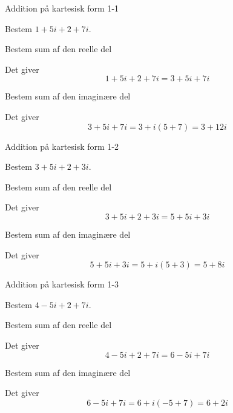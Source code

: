 \documentclass{article}
\begin{document}
\tableofcontents
\newpage

\begin{exercise}{Addition på kartesisk form 1-1}

Bestem $1+5i+2+7i$.


\hint

Bestem sum af den reelle del

\hint

Det giver
\[
1+5i+2+7i = 3 + 5i +7i
\]

\hint

Bestem sum af den imaginære del 


\hint

Det giver 
\[
3 + 5i +7i = 3 + i(5+7) = 3 + 12i
\]

\end{exercise}

\newpage

\begin{exercise}{Addition på kartesisk form 1-2}
	
	Bestem $3+5i+2+3i$.
	
	
	\hint
	
	Bestem sum af den reelle del
	
	\hint
	
	Det giver
	\[
	3+5i+2+3i = 5 + 5i+3i
	\]
	
	\hint
	
	Bestem sum af den imaginære del 
	
	
	\hint
	
	Det giver 
	\[
	5 + 5i+3i = 5 + i(5+3)  = 5 + 8i 
	\]
	
\end{exercise}

\newpage

\begin{exercise}{Addition på kartesisk form 1-3}
	
	Bestem $4-5i+2+7i$.
	
	
	\hint
	
	Bestem sum af den reelle del
	
	\hint
	
	Det giver
	\[
	4-5i+2+7i = 6 -5i +7i
	\]
	
	\hint
	
	Bestem sum af den imaginære del 
	
	
	\hint
	
	Det giver 
	\[
	6 -5i +7i = 6+ i(-5+7) = 6+2i
	\]
	
\end{exercise}
\end{document}
